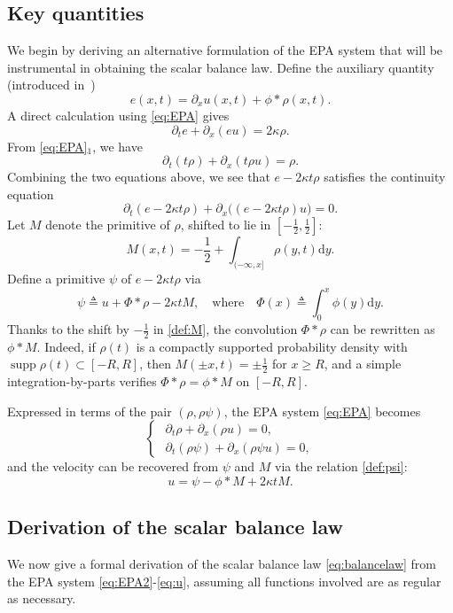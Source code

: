 \documentclass[10pt,a4paper]{amsart}
\def\dd{\mathrm{d}}
\def\pa{\partial}
\DeclareMathOperator{\supp}{supp}
\begin{document}
	\subsection{Key quantities}
	We begin by deriving an alternative formulation of the EPA system that will be instrumental in obtaining the scalar balance law. Define the auxiliary quantity (introduced in~\cite{carrillo2016critical})
	\[
	e(x,t) = \pa_x u(x,t) + \phi*\rho(x,t).
	\]
	A direct calculation using \eqref{eq:EPA} gives
	\[
	\pa_te +\pa_x(eu) = 2\kappa\rho.
	\]
	From \eqref{eq:EPA}$_1$, we have
	\[
	\pa_t(t\rho) + \pa_x(t\rho u) = \rho.
	\]
	Combining the two equations above, we see that $e-2\kappa t\rho$ satisfies the continuity equation
	\[
	\pa_t(e-2\kappa t\rho) + \pa_x\big((e-2\kappa t\rho)u\big) = 0.
	\]
	Let $M$ denote the primitive of $\rho$, shifted to lie in $[-\tfrac12,\tfrac12]$:
	\begin{equation}\label{def:M}
		M(x,t) = - \frac12 + \int_{(-\infty,x]} \rho(y,t)\dd y.	
	\end{equation}
	Define a primitive $\psi$ of $e-2\kappa t \rho$ via 
	\begin{equation}\label{def:psi}
		\psi \triangleq u + \Phi\ast\rho - 2\kappa t M,\quad \text{where}\quad \Phi(x) \triangleq \int_0^x \phi(y)\dd y.
	\end{equation}
	Thanks to the shift by $-\frac12$ in \eqref{def:M}, the convolution $\Phi\ast\rho$ can be rewritten as $\phi\ast M$.  Indeed, if $\rho(t)$ is a compactly supported probability density with $\supp\rho(t)\subset[-R,R]$, then $M(\pm x,t)=\pm\tfrac12$ for $x\ge R$, and a simple integration-by-parts verifies $\Phi*\rho=\phi*M$ on $[-R,R]$.
	
	Expressed in terms of the pair $(\rho,\rho\psi)$, the EPA system \eqref{eq:EPA} becomes
	\begin{equation}\label{eq:EPA2}
		\begin{cases}
			\,\,\pa_t \rho + \pa_x (\rho u) = 0, \\
			\,\,\pa_t (\rho \psi) + \pa_x (\rho \psi u) = 0,
		\end{cases}  
	\end{equation}
	and the velocity can be recovered from $\psi$ and $M$ via the relation \eqref{def:psi}:
	\begin{equation}
		\label{eq:u}
		u = \psi - \phi\ast M + 2\kappa tM.
	\end{equation}
	
	\subsection{Derivation of the scalar balance law}
	We now give a formal derivation of the scalar balance law \eqref{eq:balancelaw} from the EPA system \eqref{eq:EPA2}-\eqref{eq:u}, assuming all functions involved are as regular as necessary. 
	
\end{document}
